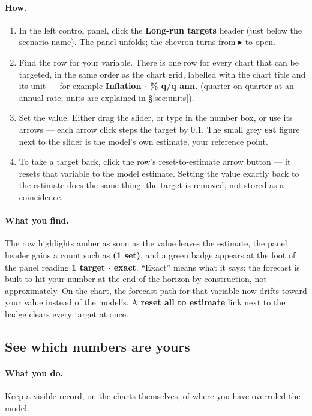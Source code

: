 \documentclass[11pt]{article}
\theoremstyle{definition}
\theoremstyle{remark}
\begin{document}
\paragraph{How.}
\begin{enumerate}
  \item In the left control panel, click the \textbf{Long-run targets} header (just
    below the scenario name). The panel unfolds; the chevron turns from
    $\blacktriangleright$ to open.
  \item Find the row for your variable. There is one row for every chart that can be
    targeted, in the same order as the chart grid, labelled with the chart title and
    its unit --- for example \textbf{Inflation \(\cdot\) \% q/q ann.} (quarter-on-quarter
    at an annual rate; units are explained in \S\ref{sec:units}).
  \item Set the value. Either drag the slider, or type in the number box, or use its
    arrows --- each arrow click steps the target by 0.1. The small grey
    \textbf{est} figure next to the slider is the model's own estimate, your
    reference point.
  \item To take a target back, click the row's reset-to-estimate arrow button --- it
    resets that variable to the model estimate. Setting the value exactly back to the
    estimate does the same thing: the target is removed, not stored as a coincidence.
\end{enumerate}

\paragraph{What you find.} The row highlights amber as soon as the value leaves the
estimate, the panel header gains a count such as \textbf{(1 set)}, and a green badge
appears at the foot of the panel reading \textbf{1 target \(\cdot\) exact}. ``Exact''
means what it says: the forecast is built to hit your number at the end of the horizon
by construction, not approximately. On the chart, the forecast path for that variable
now drifts toward your value instead of the model's. A \textbf{reset all to estimate}
link next to the badge clears every target at once.

\subsection{See which numbers are yours}

\paragraph{What you do.} Keep a visible record, on the charts themselves, of where you
have overruled the model.
\end{document}

